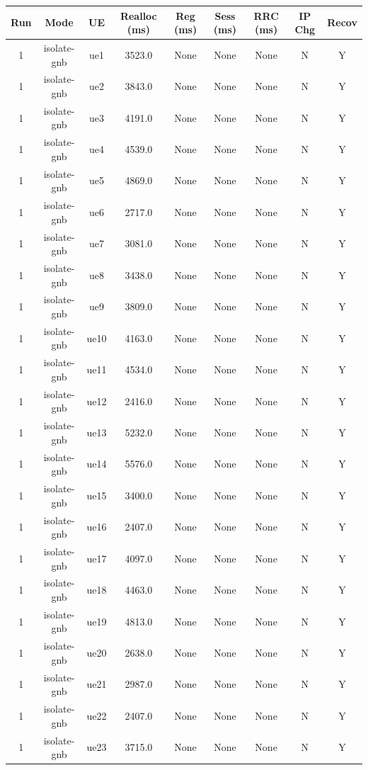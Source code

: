 \begin{table}[ht]
\centering
\begin{tabular}{|c|c|c|c|c|c|c|c|c|}
\hline
Run & Mode & UE & Realloc (ms) & Reg (ms) & Sess (ms) & RRC (ms) & IP Chg & Recov \\
\hline
1 & isolate-gnb & ue1 & 3523.0 & None & None & None & N & Y \\
1 & isolate-gnb & ue2 & 3843.0 & None & None & None & N & Y \\
1 & isolate-gnb & ue3 & 4191.0 & None & None & None & N & Y \\
1 & isolate-gnb & ue4 & 4539.0 & None & None & None & N & Y \\
1 & isolate-gnb & ue5 & 4869.0 & None & None & None & N & Y \\
1 & isolate-gnb & ue6 & 2717.0 & None & None & None & N & Y \\
1 & isolate-gnb & ue7 & 3081.0 & None & None & None & N & Y \\
1 & isolate-gnb & ue8 & 3438.0 & None & None & None & N & Y \\
1 & isolate-gnb & ue9 & 3809.0 & None & None & None & N & Y \\
1 & isolate-gnb & ue10 & 4163.0 & None & None & None & N & Y \\
1 & isolate-gnb & ue11 & 4534.0 & None & None & None & N & Y \\
1 & isolate-gnb & ue12 & 2416.0 & None & None & None & N & Y \\
1 & isolate-gnb & ue13 & 5232.0 & None & None & None & N & Y \\
1 & isolate-gnb & ue14 & 5576.0 & None & None & None & N & Y \\
1 & isolate-gnb & ue15 & 3400.0 & None & None & None & N & Y \\
1 & isolate-gnb & ue16 & 2407.0 & None & None & None & N & Y \\
1 & isolate-gnb & ue17 & 4097.0 & None & None & None & N & Y \\
1 & isolate-gnb & ue18 & 4463.0 & None & None & None & N & Y \\
1 & isolate-gnb & ue19 & 4813.0 & None & None & None & N & Y \\
1 & isolate-gnb & ue20 & 2638.0 & None & None & None & N & Y \\
1 & isolate-gnb & ue21 & 2987.0 & None & None & None & N & Y \\
1 & isolate-gnb & ue22 & 2407.0 & None & None & None & N & Y \\
1 & isolate-gnb & ue23 & 3715.0 & None & None & None & N & Y \\

\end{tabular}
\end{table}

